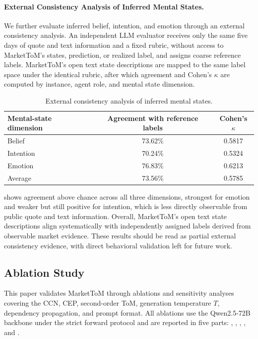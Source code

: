 \documentclass[a4paper,fleqn,doubleblind]{cas-sc}
\newcommand{\revise}[1]{{\color{blue}#1}}
\begin{document}
\revise{
\paragraph{External Consistency Analysis of Inferred Mental States.}
We further evaluate inferred belief, intention, and emotion through an external consistency analysis. An independent LLM evaluator receives only the same five days of quote and text information and a fixed rubric, without access to MarketToM's states, prediction, or realized label, and assigns coarse reference labels. MarketToM's open text state descriptions are mapped to the same label space under the identical rubric, after which agreement and Cohen's $\kappa$ are computed by instance, agent role, and mental state dimension.

\begin{table}[htbp]
\centering
\small
\caption{External consistency analysis of inferred mental states.}
\label{tab:external_consistency}
\begin{tabular}{lcc}
\toprule
\textbf{Mental-state dimension} & \textbf{Agreement with reference labels} & \textbf{Cohen's $\kappa$} \\
\midrule
Belief & 73.62\% & 0.5817 \\
Intention & 70.24\% & 0.5324 \\
Emotion & 76.83\% & 0.6213 \\
\midrule
Average & 73.56\% & 0.5785 \\
\bottomrule
\end{tabular}
\end{table}

\Cref{tab:external_consistency} shows agreement above chance across all three dimensions, strongest for emotion and weaker but still positive for intention, which is less directly observable from public quote and text information. Overall, MarketToM's open text state descriptions align systematically with independently assigned labels derived from observable market evidence. These results should be read as partial external consistency evidence, with direct behavioral validation left for future work.
}


\subsection{Ablation Study}
\label{sec:ablation_study}
This paper validates MarketToM through ablations and sensitivity analyses covering the CCN, CEP, second-order ToM, generation temperature $T$, dependency propagation, and prompt format. All ablations use the Qwen2.5-72B backbone under the strict forward protocol and are reported in five parts: , , , , and .
\end{document}
